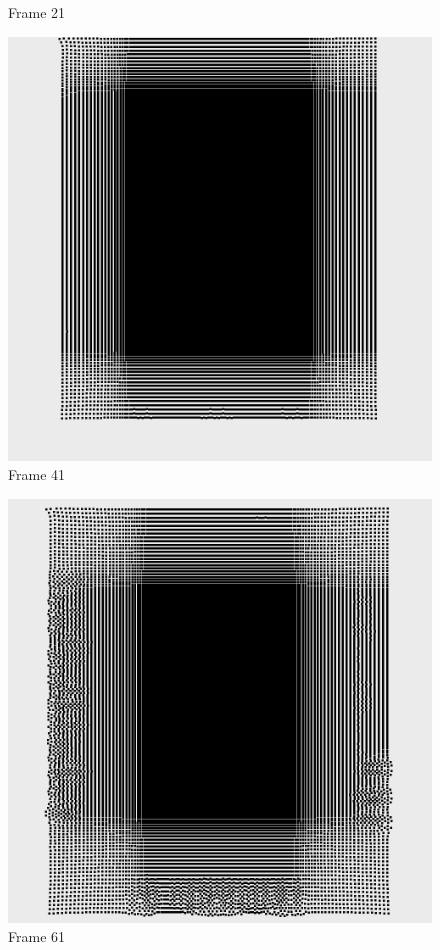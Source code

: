 \documentclass[a4paper, 12pt, oneside]{book}
\begin{document}
\begin{figure}[!ht]
\begin{center}
            Frame 21
        \end{center}
    \endminipage
    \hfill
        \begin{center}
            \includegraphics[width=\linewidth]{images/test_case_1/41.png}
            Frame 41
        \end{center}
    \endminipage
    \hfill
        \begin{center}
            \includegraphics[width=\linewidth]{images/test_case_1/61.png}
            Frame 61
        \end{center}
    \endminipage
    \hfill


\end{figure}
\end{document}
